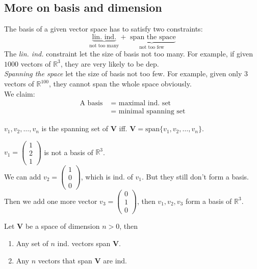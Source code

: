 \subsection{More on basis and dimension}
The basis of a given vector space has to satisfy two constraints:
\[
\underbrace{\text{lin. ind.}}_{\text{not too many}}+\underbrace{\text{ span the space}}_{\text{not too few}}
\]
The \emph{lin. ind.} constraint let the size of basis not too many. For example, if given $1000$ vectors of $\mathbb{R}^{3}$, they are very likely to be dep. \\
\emph{Spanning the space} let the size of basis not too few. For example, given only $3$ vectors of $\mathbb{R}^{100}$, they cannot span the whole space obviously.\\
We claim: \begin{align*}
\text{A basis }&=\text{ maximal ind. set}\\
&=\text{ minimal spanning set}
\end{align*}
\begin{definition}
$v_1,v_2,\dots,v_n$ is the spanning set of $\bm V$ iff. $\bm V = \text{span}\{v_1,v_2,\dots,v_n\}$.
\end{definition}
\begin{example}
$v_1 = \begin{pmatrix}
1\\2\\1
\end{pmatrix}$ is not a basis of $\mathbb{R}^{3}$.\\
We can add $v_2 = \begin{pmatrix}
1\\0\\0
\end{pmatrix}$, which is ind. of $v_1$. But they still don't form a basis.\\
Then we add one more vector $v_3 = \begin{pmatrix}
0\\1\\0
\end{pmatrix}$, then $v_1,v_2,v_3$ form a basis of $\mathbb{R}^{3}$.
\end{example}
\begin{theorem}\label{theorem_3.3}
Let $\bm V$ be a space of dimension $n>0$, then
\begin{enumerate}
\item
Any set of $n$ ind. vectors span $\bm V$.
\item
Any $n$ vectors that span $\bm V$ are ind.
\end{enumerate}
\end{theorem}

